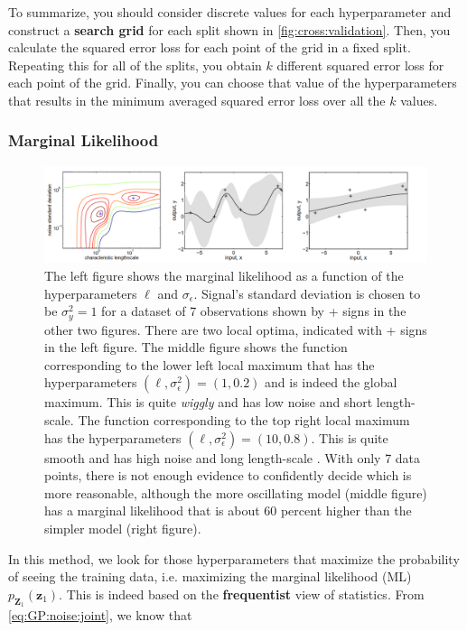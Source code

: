 \documentclass[10pt]{article}
\theoremstyle{definition}
\begin{document}
To summarize, you should consider discrete values for each hyperparameter and construct a \textbf{search grid} for each split shown in \cref{fig:cross:validation}. Then, you calculate the squared error loss for each point of the grid in a fixed split. Repeating this for all of the splits, you obtain $k$ different squared error loss for each point of the grid. Finally, you can choose that value of the hyperparameters that results in the minimum averaged squared error loss over all the $k$ values.

\subsubsection{Marginal Likelihood}
\begin{figure}[t!]
\centering
\includegraphics[width=17cm]{figs/marginal-likelihood.png}
\caption{The left figure shows the marginal likelihood as a function of the hyperparameters $\ell$ and $\sigma_{\epsilon}$. Signal's standard
deviation is chosen to be $\sigma_y^2 = 1$ for a dataset of 7 observations shown by + signs in the other two figures. There are two local optima, indicated with + signs in the left figure. The middle figure shows the function corresponding to the lower left local maximum that has the hyperparameters $(\ell, \sigma_{\epsilon}^2)=(1, 0.2)$ and is indeed the global maximum. This is quite \textit{wiggly} and has low noise and short length-scale. The function corresponding to the top right local maximum has the hyperparameters $(\ell, \sigma_{\epsilon}^2)=(10, 0.8)$. This is quite smooth and has high noise and long length-scale \cite[Section 5.4.1]{Rasmussen2006}. With only 7 data points, there is not enough evidence to confidently decide which is more reasonable, although the more oscillating model (middle figure) has a marginal likelihood that is about 60 percent higher than the simpler model (right figure)\cite[Section 15.2.4]{Murphy2012}.}
\label{fig:marginal:likelihood}
\end{figure}
In this method, we look for those hyperparameters that maximize the probability of seeing the training data, i.e. maximizing the marginal likelihood (ML) $p_{\mathbf{Z}_1}(\mathbf{z}_1)$. This is indeed based on the \textbf{frequentist} view of statistics. From \eqref{eq:GP:noise:joint}, we know that
\end{document}
